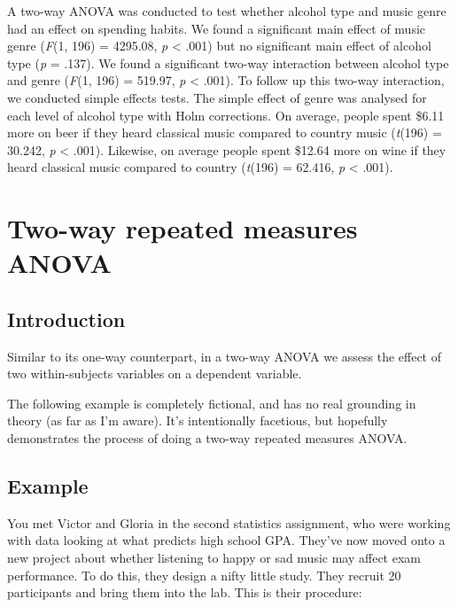 \documentclass[
]{book}
\begin{document}
A two-way ANOVA was conducted to test whether alcohol type and music genre had an effect on spending habits. We found a significant main effect of music genre (\emph{F}(1, 196) = 4295.08, \emph{p} \textless{} .001) but no significant main effect of alcohol type (\emph{p} = .137). We found a significant two-way interaction between alcohol type and genre (\emph{F}(1, 196) = 519.97, \emph{p} \textless{} .001). To follow up this two-way interaction, we conducted simple effects tests. The simple effect of genre was analysed for each level of alcohol type with Holm corrections. On average, people spent \$6.11 more on beer if they heard classical music compared to country music (\emph{t}(196) = 30.242, \emph{p} \textless{} .001). Likewise, on average people spent \$12.64 more on wine if they heard classical music compared to country (\emph{t}(196) = 62.416, \emph{p} \textless{} .001).

\hypertarget{two-way-repeated-measures-anova}{%
\section{Two-way repeated measures ANOVA}\label{two-way-repeated-measures-anova}}

\hypertarget{introduction-2}{%
\subsection{Introduction}\label{introduction-2}}

Similar to its one-way counterpart, in a two-way ANOVA we assess the effect of two within-subjects variables on a dependent variable.

The following example is completely fictional, and has no real grounding in theory (as far as I'm aware). It's intentionally facetious, but hopefully demonstrates the process of doing a two-way repeated measures ANOVA.

\hypertarget{example-3}{%
\subsection{Example}\label{example-3}}

You met Victor and Gloria in the second statistics assignment, who were working with data looking at what predicts high school GPA. They've now moved onto a new project about whether listening to happy or sad music may affect exam performance. To do this, they design a nifty little study. They recruit 20 participants and bring them into the lab. This is their procedure:
\end{document}
